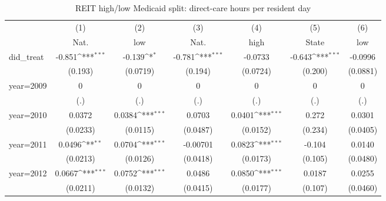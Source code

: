 \begin{table}[htbp]\centering
\def\sym#1{\ifmmode^{#1}\else\(^{#1}\)\fi}
\caption{REIT high/low Medicaid split: direct-care hours per resident day}
\begin{tabular}{l*{6}{c}}
\hline\hline
                    &\multicolumn{1}{c}{(1)}&\multicolumn{1}{c}{(2)}&\multicolumn{1}{c}{(3)}&\multicolumn{1}{c}{(4)}&\multicolumn{1}{c}{(5)}&\multicolumn{1}{c}{(6)}\\
                    &\multicolumn{1}{c}{Nat.}&\multicolumn{1}{c}{low}&\multicolumn{1}{c}{Nat.}&\multicolumn{1}{c}{high}&\multicolumn{1}{c}{State}&\multicolumn{1}{c}{low}\\
\hline
did\_treat           &      -0.851\sym{***}&      -0.139\sym{*}  &      -0.781\sym{***}&     -0.0733         &      -0.643\sym{***}&     -0.0996         \\
                    &     (0.193)         &    (0.0719)         &     (0.194)         &    (0.0724)         &     (0.200)         &    (0.0881)         \\
[1em]
year=2009           &           0         &           0         &           0         &           0         &           0         &           0         \\
                    &         (.)         &         (.)         &         (.)         &         (.)         &         (.)         &         (.)         \\
[1em]
year=2010           &      0.0372         &      0.0384\sym{***}&      0.0703         &      0.0401\sym{***}&       0.272         &      0.0301         \\
                    &    (0.0233)         &    (0.0115)         &    (0.0487)         &    (0.0152)         &     (0.234)         &    (0.0405)         \\
[1em]
year=2011           &      0.0496\sym{**} &      0.0704\sym{***}&    -0.00701         &      0.0823\sym{***}&      -0.104         &      0.0140         \\
                    &    (0.0213)         &    (0.0126)         &    (0.0418)         &    (0.0173)         &     (0.105)         &    (0.0480)         \\
[1em]
year=2012           &      0.0667\sym{***}&      0.0752\sym{***}&      0.0486         &      0.0850\sym{***}&      0.0187         &      0.0255         \\
                    &    (0.0211)         &    (0.0132)         &    (0.0415)         &    (0.0177)         &     (0.107)         &    (0.0460)         \\

\end{tabular}
\end{table}

